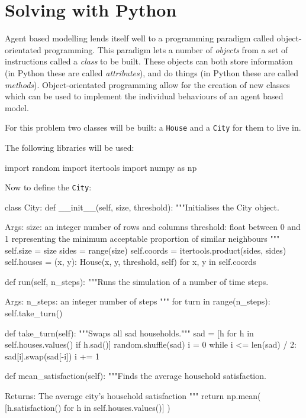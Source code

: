 \section{Solving with Python}\label{sec:agent_based_simulation_solving-with-python}

Agent based modelling lends itself well to a programming paradigm called
object-orientated programming.
This paradigm lets a number of \textit{objects} from a set of instructions
called a \textit{class} to be built.
These objects can both store information (in Python these are called
\textit{attributes}), and do things (in Python these are called
\textit{methods}).
Object-orientated programming allow for the creation of new classes which can be
used to implement the individual behaviours of an agent based model.

For this problem two classes will be built: a
\texttt{House} and a \texttt{City} for them to live in.

The following libraries will be used:

\begin{pyin}
import random
import itertools
import numpy as np
\end{pyin}

Now to define the \texttt{City}:

\begin{pyin}
class City:
    def __init__(self, size, threshold):
        """Initialises the City object.

        Args:
            size: an integer number of rows and columns
            threshold: float between 0 and 1 representing the
            minimum acceptable proportion of similar neighbours
        """
        self.size = size
        sides = range(size)
        self.coords = itertools.product(sides, sides)
        self.houses = {
            (x, y): House(x, y, threshold, self)
            for x, y in self.coords
        }

    def run(self, n_steps):
        """Runs the simulation of a number of time steps.

        Args:
            n_steps: an integer number of steps
        """
        for turn in range(n_steps):
            self.take_turn()

    def take_turn(self):
        """Swaps all sad households."""
        sad = [h for h in self.houses.values() if h.sad()]
        random.shuffle(sad)
        i = 0
        while i <= len(sad) / 2:
            sad[i].swap(sad[-i])
            i += 1

    def mean_satisfaction(self):
        """Finds the average household satisfaction.

        Returns:
            The average city's household satisfaction
        """
        return np.mean(
            [h.satisfaction() for h in self.houses.values()]
        )
\end{pyin}

